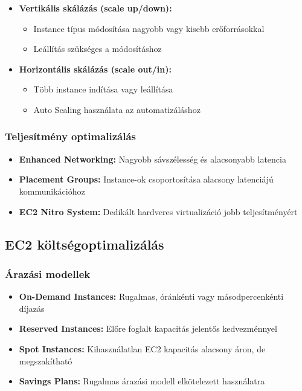 \documentclass[a4paper,12pt]{article}
\begin{document}
    \begin{itemize}
        \item \textbf{Vertikális skálázás (scale up/down):}
        \begin{itemize}
            \item Instance típus módosítása nagyobb vagy kisebb erőforrásokkal
            \item Leállítás szükséges a módosításhoz
        \end{itemize}
        \item \textbf{Horizontális skálázás (scale out/in):}
        \begin{itemize}
            \item Több instance indítása vagy leállítása
            \item Auto Scaling használata az automatizáláshoz
        \end{itemize}
    \end{itemize}

    \subsubsection{Teljesítmény optimalizálás}

    \begin{itemize}
        \item \textbf{Enhanced Networking:} Nagyobb sávszélesség és alacsonyabb latencia
        \item \textbf{Placement Groups:} Instance-ok csoportosítása alacsony latenciájú kommunikációhoz
        \item \textbf{EC2 Nitro System:} Dedikált hardveres virtualizáció jobb teljesítményért
    \end{itemize}

    \subsection{EC2 költségoptimalizálás}

    \subsubsection{Árazási modellek}

    \begin{itemize}
        \item \textbf{On-Demand Instances:} Rugalmas, óránkénti vagy másodpercenkénti díjazás
        \item \textbf{Reserved Instances:} Előre foglalt kapacitás jelentős kedvezménnyel
        \item \textbf{Spot Instances:} Kihasználatlan EC2 kapacitás alacsony áron, de megszakítható
        \item \textbf{Savings Plans:} Rugalmas árazási modell elkötelezett használatra
    \end{itemize}
\end{document}
